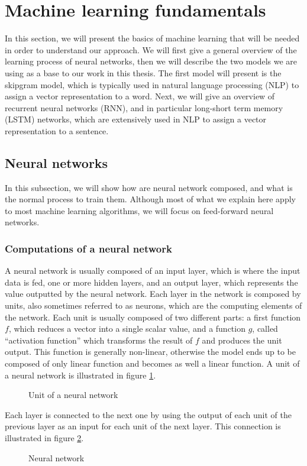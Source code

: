 \section{Machine learning fundamentals}
In this section, we will present the basics of machine learning that will be
needed in order to understand our approach. We will first give a general
overview of the learning process of neural networks, then we will describe
the two models we are using as a base to our work in this thesis.
The first model will present is the skipgram model, which is typically used in
natural language processing (NLP) to assign a vector representation to a word.
Next, we will give an overview of recurrent neural networks (RNN), and in
particular long-short term memory (LSTM) networks, which are extensively used in
NLP to assign a vector representation to a sentence.
\subsection{Neural networks}
In this subsection, we will show how are neural network composed, and what is
the normal process to train them. Although most of what we explain here apply to
most machine learning algorithms, we will focus on feed-forward neural networks.
\subsubsection{Computations of a neural network}
A neural network \cite{Rojas:1996:NNS:235222} is usually composed of an input
layer, which is where the input data is fed, one or more hidden layers, and an
output layer, which represents the value outputted by the neural network.
Each layer in the network is composed by units, also sometimes referred to as
neurons, which are the computing elements of the network. Each unit is usually
composed of two different parts: a first function $f$, which reduces a vector
into a single scalar value, and a function $g$, called ``activation function''
which transforms the result of $f$ and produces the unit output. This function
is generally non-linear, otherwise the model ends up to be composed of only
linear function and becomes as well a linear function.
A unit of a neural network is illustrated in figure \ref{fig:neuron}.
\begin{figure}[tb]
  \centering
  \caption{\label{fig:neuron}Unit of a neural network}
\end{figure}
Each layer is connected to the next one by using the output of each unit of the
previous layer as an input for each unit of the next layer. This connection is
illustrated in figure \ref{fig:neural-net}.
\begin{figure}[tb]
  \centering
  \caption{\label{fig:neural-net}Neural network}
\end{figure}

